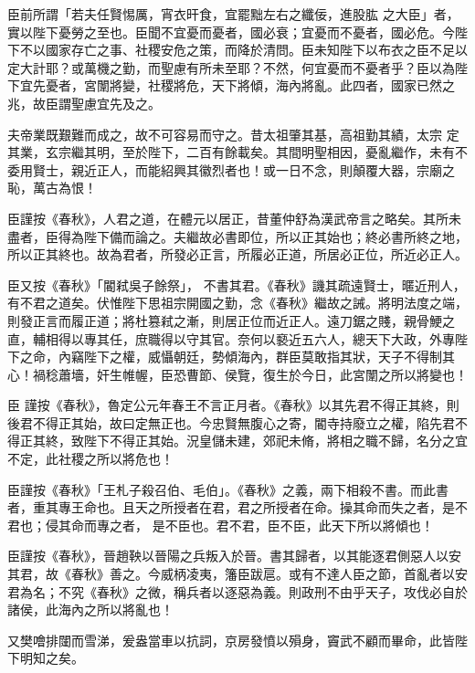 \begin{pinyinscope}
 臣前所謂「若夫任賢惕厲，宵衣旰食，宜罷黜左右之纖佞，進股肱
 之大臣」者，實以陛下憂勞之至也。臣聞不宜憂而憂者，國必衰；宜憂而不憂者，國必危。今陛下不以國家存亡之事、社稷安危之策，而降於清問。臣未知陛下以布衣之臣不足以定大計耶？或萬機之勤，而聖慮有所未至耶？不然，何宜憂而不憂者乎？臣以為陛下宜先憂者，宮闈將變，社稷將危，天下將傾，海內將亂。此四者，國家已然之兆，故臣謂聖慮宜先及之。



 夫帝業既艱難而成之，故不可容易而守之。昔太祖肇其基，高祖勤其績，太宗
 定其業，玄宗繼其明，至於陛下，二百有餘載矣。其間明聖相因，憂亂繼作，未有不委用賢士，親近正人，而能紹興其徽烈者也！或一日不念，則顛覆大器，宗廟之恥，萬古為恨！



 臣謹按《春秋》，人君之道，在體元以居正，昔董仲舒為漢武帝言之略矣。其所未盡者，臣得為陛下備而論之。夫繼故必書即位，所以正其始也；終必書所終之地，所以正其終也。故為君者，所發必正言，所履必正道，所居必正位，所近必正人。



 臣又按《春秋》「閽弒吳子餘祭」，
 不書其君。《春秋》譏其疏遠賢士，暱近刑人，有不君之道矣。伏惟陛下思祖宗開國之勤，念《春秋》繼故之誡。將明法度之端，則發正言而履正道；將杜篡弒之漸，則居正位而近正人。遠刀鋸之賤，親骨鯁之直，輔相得以專其任，庶職得以守其官。奈何以褻近五六人，總天下大政，外專陛下之命，內竊陛下之權，威懾朝廷，勢傾海內，群臣莫敢指其狀，天子不得制其心！禍稔蕭墻，奸生帷幄，臣恐曹節、侯覽，復生於今日，此宮闈之所以將變也！



 臣
 謹按《春秋》，魯定公元年春王不言正月者。《春秋》以其先君不得正其終，則後君不得正其始，故曰定無正也。今忠賢無腹心之寄，閽寺持廢立之權，陷先君不得正其終，致陛下不得正其始。況皇儲未建，郊祀未脩，將相之職不歸，名分之宜不定，此社稷之所以將危也！



 臣謹按《春秋》「王札子殺召伯、毛伯」。《春秋》之義，兩下相殺不書。而此書者，重其專王命也。且天之所授者在君，君之所授者在命。操其命而失之者，是不君也；侵其命而專之者，
 是不臣也。君不君，臣不臣，此天下所以將傾也！



 臣謹按《春秋》，晉趙鞅以晉陽之兵叛入於晉。書其歸者，以其能逐君側惡人以安其君，故《春秋》善之。今威柄凌夷，籓臣跋扈。或有不達人臣之節，首亂者以安君為名；不究《春秋》之微，稱兵者以逐惡為義。則政刑不由乎天子，攻伐必自於諸侯，此海內之所以將亂也！



 又樊噲排闥而雪涕，爰盎當車以抗詞，京房發憤以殞身，竇武不顧而畢命，此皆陛下明知之矣。




\end{pinyinscope}
